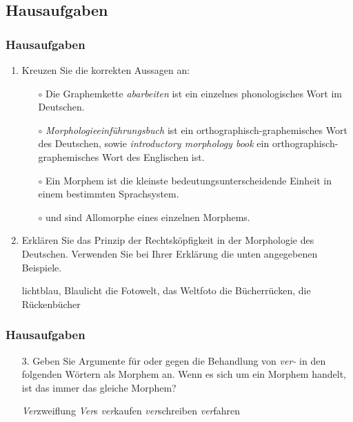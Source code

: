 
\subsection{Hausaufgaben}

\begin{frame}
	\frametitle{Hausaufgaben}

	
\begin{enumerate}
	 \item Kreuzen Sie die korrekten Aussagen an: %

\begin{itemize}
	\item[$\circ$] Die Graphemkette \emph{abarbeiten} ist ein einzelnes phonologisches Wort im Deutschen.
	\item[$\circ$] \emph{Morphologieeinführungsbuch} ist ein orthographisch-graphemisches Wort des Deutschen, sowie \emph{introductory morphology book} ein orthographisch-graphemisches Wort des Englischen ist.
	\item[$\circ$] Ein Morphem ist die kleinste bedeutungsunterscheidende Einheit in einem bestimmten Sprachsystem.
	\item[$\circ$]  und  sind Allomorphe eines einzelnen Morphems.
\end{itemize}

	\item Erklären Sie das Prinzip der Rechtsköpfigkeit in der Morphologie des Deutschen. Verwenden Sie bei Ihrer Erklärung die unten angegebenen Beispiele.%

\eal
\ex lichtblau, Blaulicht
\ex die Fotowelt, das Weltfoto
\ex die Bücherrücken, die Rückenbücher
\zl
\end{enumerate}

\end{frame}



\begin{frame}
\frametitle{Hausaufgaben}
\begin{itemize}
	\item[3.] Geben Sie Argumente für oder gegen die Behandlung von \emph{ver-} in den folgenden Wörtern als Morphem an. Wenn es sich um ein Morphem handelt, ist das immer das gleiche Morphem? %

	\eal
	\ex \emph{Ver}zweiflung
	\ex \emph{Ver}s
	\ex \emph{ver}kaufen
	\ex \emph{ver}schreiben
	\ex \emph{ver}fahren
	\zl

\end{itemize}
\end{frame}



